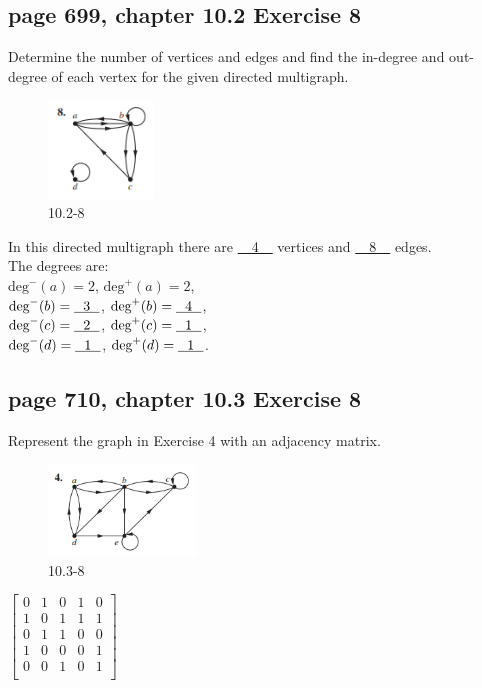 \documentclass[sigconf]{acmart}
\begin{document}
\vspace{3cm}

\subsection{page 699, chapter 10.2 Exercise 8}
\begin{shaded}
    Determine the number of vertices and edges and find the in-degree and out-degree of each vertex for the given directed multigraph.
\end{shaded}
\begin{figure}[h]
    \centering
    \includegraphics[width=0.25\textwidth]{10.2-8.png}
    \caption{10.2-8}
    \label{fig:a}
\end{figure}
In this directed multigraph there are \uline{~~4~~} vertices and \uline{~~8~~} edges.\\ The degrees are:\\ 
$\text{deg}^{-}(a) = 2$, $\text{deg}^{+}(a) = 2$, \\
$\text{deg}^{-}(b) = \uline{\text{~~3~~}}$, $\text{deg}^{+}(b) = \uline{\text{~~4~~}}$, \\
$\text{deg}^{-}(c) = \uline{\text{~~2~~}}$, $\text{deg}^{+}(c) = \uline{\text{~~1~~}}$, \\
$\text{deg}^{-}(d) = \uline{\text{~~1~~}}$, $\text{deg}^{+}(d) = \uline{\text{~~1~~}}$.

\clearpage

\subsection{page 710, chapter 10.3 Exercise 8}
\begin{shaded}
    Represent the graph in Exercise 4 with an adjacency matrix.
\end{shaded}
\begin{figure}[h]
    \centering
    \includegraphics[width=0.35\textwidth]{10.3-8.png}
    \caption{10.3-8}
    \label{fig:b}
\end{figure}
$\begin{bmatrix}
	   0 & 1 & 0 & 1 & 0 \\
 	   1 & 0 & 1 & 1 & 1 \\
 	   0 & 1 & 1 & 0 & 0 \\
 	   1 & 0 & 0 & 0 & 1 \\
 	   0 & 0 & 1 & 0 & 1 \\
\end{bmatrix}$
\end{document}
